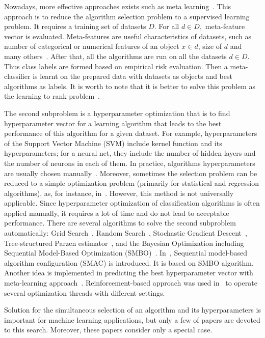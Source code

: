 \documentclass{svproc}
\begin{document}
Nowadays, more effective approaches exists such as meta learning~\cite{metalearn,abdulrahman2015algorithm}. This approach is to reduce the algorithm selection problem to a supervised learning problem. It requires a training set of datasets $D$. For all $d \in D,$ meta-feature vector is evaluated. Meta-features are useful characteristics of datasets, such as number of categorical or numerical features of an object $x \in d$, size of $d$ and many others~\cite{afil2015,castiello2005meta}. After that, all the algorithms are run on all the datasets $d \in D$. Thus class labels are formed based on empirical risk evaluation. Then a meta-classifier is learnt on the prepared data with datasets as objects and best algorithms as labels. It is worth to note that it is better to solve this problem as the learning to rank problem~\cite{brazdil2003ranking,cashmeta2}.

The second subproblem is a hyperparameter optimization that is to find hyperparameter vector for a learning algorithm that leads to the best performance of this algorithm for a given dataset. For example, hyperparameters of the Support Vector Machine (SVM) include kernel function and its hyperparameters; for a neural net, they include the number of hidden layers and the number of neurons in each of them. In practice, algorithms hyperparameters are usually chosen manually~\cite{hutman}. Moreover, sometimes the selection problem can be reduced to a simple optimization problem (primarily for statistical and regression algorithms), as, for instance, in~\cite{strijov}. However, this method is not universally applicable. Since hyperparameter optimization of classification algorithms is often applied manually, it requires a lot of time and do not lead to acceptable performance. There are several algorithms to solve the second subproblem automatically: Grid Search~\cite{random}, Random Search~\cite{grid}, Stochastic Gradient Descent~\cite{sgd}, Tree-structured Parzen estimator~\cite{tpe}, and the Bayesian Optimization including Sequential Model-Based Optimization (SMBO)~\cite{bayes1}. In~\cite{smac}, Sequential model-based algorithm configuration (SMAC) is introduced. It is based on SMBO algorithm. Another idea is implemented in predicting the best hyperparameter vector with meta-learning approach~\cite{mantovani2015meta}. Reinforcement-based approach was used in~\cite{jamieson2015non} to operate several optimization threads with different settings.

Solution for the simultaneous selection of an algorithm and its hyperparameters is important for machine learning applications, but only a few of papers are devoted to this search. Moreover, these papers consider only a special case. 
\end{document}
